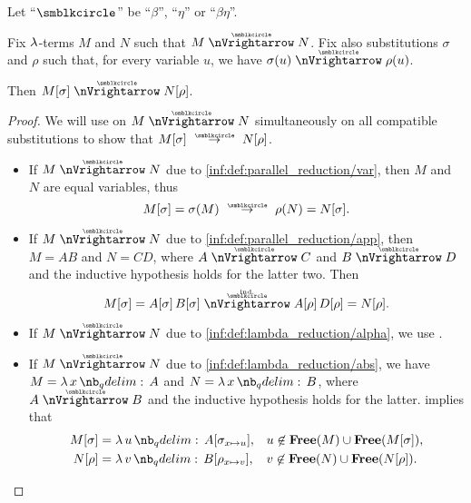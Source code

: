 \begin{proposition}\label{thm:substitution_on_parallel_reduction}
  Let \enquote{\( {\anon} \)} be \enquote{\( \beta \)}, \enquote{\( \eta \)} or \enquote{\( \beta\eta \)}.

  Fix \( \mathrm{\lambda} \)-terms \( M \) and \( N \) such that \( M \ppred N \). Fix also substitutions \( \sigma \) and \( \rho \) such that, for every variable \( u \), we have \( \sigma(u) \ppred \rho(u) \).

  Then \( M[\sigma] \ppred N[\rho] \).
\end{proposition}
\begin{proof}
  We will use  on \( M \ppred N \) simultaneously on all compatible substitutions to show that \( M[\sigma] \pred N[\rho] \).
  \begin{itemize}
    \item If \( M \ppred N \) due to \ref{inf:def:parallel_reduction/var}, then \( M \) and \( N \) are equal variables, thus
    \begin{equation*}
      M[\sigma] = \sigma(M) \pred \rho(N) = N[\sigma].
    \end{equation*}

    \item If \( M \ppred N \) due to \ref{inf:def:parallel_reduction/app}, then \( M = AB \) and \( N = CD \), where \( A \ppred C \) and \( B \ppred D \) and the inductive hypothesis holds for the latter two. Then
    \begin{equation*}
      M[\sigma]
      =
      A[\sigma] \thinspace B[\sigma]
      \reloset {\T{ind.}} \ppred
      A[\rho] \thinspace D[\rho]
      =
      N[\rho].
    \end{equation*}

    \item If \( M \ppred N \) due to \ref{inf:def:lambda_reduction/alpha}, we use .

    \item If \( M \ppred N \) due to \ref{inf:def:lambda_reduction/abs}, we have \( M = \qabs x A \) and \( N = \qabs x B \), where \( A \ppred B \) and the inductive hypothesis holds for the latter.  implies that
    \begin{align*}
      M[\sigma] &= \qabs u A[\sigma_{x \mapsto u}], &&u \not\in \op*{Free}(M) \cup \op*{Free}(M[\sigma]), \\
      N[\rho]   &= \qabs v B[\rho_{x \mapsto v}],   &&v \not\in \op*{Free}(N) \cup \op*{Free}(N[\rho]).
    \end{align*}


\end{itemize}
\end{proof}
